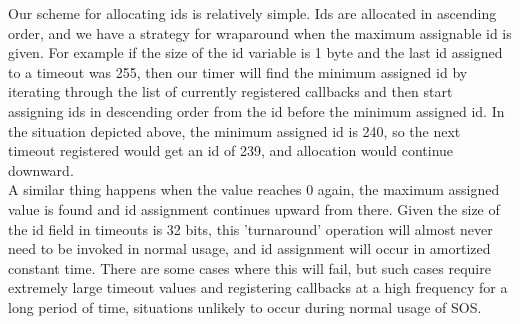 \noindent
Our scheme for allocating ids is relatively simple. Ids are allocated in ascending
order, and we have a strategy for wraparound when the maximum assignable id is given.
For example if the size of the id variable is 1 byte and the last id assigned to a 
timeout was 255, then our timer will find the minimum assigned id by iterating
through the list of currently registered callbacks and then start assigning ids 
in descending order from the id before the minimum assigned id. In the situation
depicted above, the minimum assigned id is 240, so the next timeout registered would get
an id of 239, and allocation would continue downward.
\\

\noindent
A similar thing
happens when the value reaches 0 again, the maximum assigned value is found and
id assignment continues upward from there. Given the size of the id field in timeouts
is 32 bits, this 'turnaround' operation will almost never need to be invoked in 
normal usage, and id assignment will occur in amortized constant time. There are
some cases where this will fail, but such cases require extremely large timeout
values and registering callbacks at a high frequency for a long period of time,
situations unlikely to occur during normal usage of SOS.